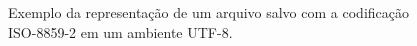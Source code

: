 
\begin{figure}[H]
\caption{Exemplo da representação de um arquivo salvo com a codificação ISO-8859-2 em um ambiente UTF-8.}
\vspace{6mm}
    \begin{center}

\end{center}
\end{figure}
